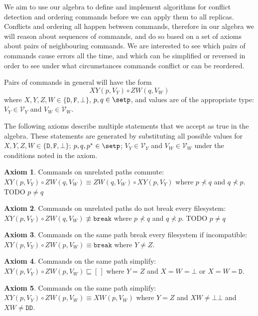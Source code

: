 \documentclass[12pt]{article}
\newcommand{\setvx}[1]{\mathcal{V}_{#1}}
\newcommand{\empt}{\bot}
\newcommand{\pp}{p^*} %
\newcommand{\cbrk}{\mathtt{break}}
\newcommand{\fscommand}[2]{{#1#2}}
\newcommand{\fsregcommandchar}[1]{\mathtt{#1}}
\newcommand{\fsregcommand}[2]{\fscommand{\fsregcommandchar{#1}}{\fsregcommandchar{#2}}}
\newcommand{\cbb}{\fsregcommand{\empt}{\empt}}
\newcommand{\cdd}{\fsregcommand{D}{D}}
\newcommand{\cxy}{\fscommand{X}{Y}}
\newcommand{\cxw}{\fscommand{X}{W}}
\newcommand{\czw}{\fscommand{Z}{W}}
\newcommand{\typeset}{\{\fsregcommandchar{D},\fsregcommandchar{F},\empt\}} %
\newcommand{\cc}{\circ} %
\newcommand{\descendant}{\prec}
\newcommand{\eqext}{\sqsubseteq}
\newcommand{\nequiv}{\not\equiv}
\newcommand{\emptyseq}{[\,]} %
\theoremstyle{definition}
\newtheorem{myax}{Axiom}
\begin{document}
We aim to use our algebra to define and implement algorithms for conflict detection
and ordering commands before we can apply them to all replicas.
Conflicts and ordering all happen between commands, therefore in our algebra
we will reason about sequences of commands, 
and do so based on a set of axioms about pairs of neighbouring commands.
We are interested to see which pairs of commands cause errors all the time,
and which can be simplified or reversed
in order to see under what circumstances commands conflict or can be reordered.

Pairs of commands in general will have the form
\[ \cxy(p,V_Y)\cc  \czw(q,V_W) \]
where $X,Y,Z,W\in\typeset$, $p,q\in\setp$, 
and values are of the appropriate type: 
$V_Y\in\setvx{Y}$ and $V_W\in\setvx{W}$.

The following axioms describe multiple statements
that we accept as true in the algebra.
These statements are generated by substituting 
all possible values for
$X,Y,Z,W\in\typeset$; $p,q,\pp\in\setp$; $V_Y\in\setvx{Y}$ and $V_W\in\setvx{W}$
under the conditions noted in the axiom.


\begin{myax}\label{ax_separate_commute}
Commands on unrelated paths commute:
$\cxy(p,V_Y)\cc  \czw(q,V_W) \equiv \czw(q,V_W)\cc  \cxy(p,V_Y)$ where $p\not\descendant q$ and $q\not\descendant p$.
TODO $p\neq q$
\end{myax}

\begin{myax}\label{ax_separate_nobreaks}
Commands on unrelated paths do not break every filesystem:
$\cxy(p,V_Y)\cc  \czw(q,V_W) \nequiv \cbrk$ where $p\not\descendant q$ and $q\not\descendant p$.
TODO $p\neq q$
\end{myax}


\begin{myax}\label{ax_same_breaks}
Commands on the same path break every filesystem if incompatible:
$\cxy(p,V_Y)\cc  \czw(p,V_W) \equiv \cbrk$ where $Y\ne Z$.
\end{myax}

\begin{myax}\label{ax_same_emptyseq}
Commands on the same path simplify:
$\cxy(p,V_Y)\cc  \czw(p,V_W) \eqext \emptyseq$ where $Y=Z$ and $X=W=\fsregcommandchar{\empt}$ or $X=W=\fsregcommandchar{D}$.
\end{myax}

\begin{myax}\label{ax_same_singlec}
Commands on the same path simplify:
$\cxy(p,V_Y)\cc  \czw(p,V_W) \equiv \cxw(p,V_W)$ where $Y=Z$ and $XW\neq\cbb$ and $XW\neq\cdd$.
\end{myax}
\end{document}

